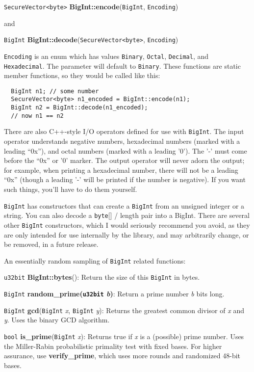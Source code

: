 \documentclass{article}
\newcommand{\function}[1]{\textbf{#1}}
\newcommand{\type}[1]{\texttt{#1}}
\renewcommand{\arg}[1]{\textsl{#1}}
\begin{document}
\type{SecureVector<byte>} \function{BigInt::encode}(\type{BigInt},
\type{Encoding})

\noindent
and

\type{BigInt} \function{BigInt::decode}(\type{SecureVector<byte>},
\type{Encoding})

\type{Encoding} is an enum which has values \type{Binary}, \type{Octal},
\type{Decimal}, and \type{Hexadecimal}. The parameter will default to
\type{Binary}. These functions are static member functions, so they would be
called like this:

\begin{verbatim}
  BigInt n1; // some number
  SecureVector<byte> n1_encoded = BigInt::encode(n1);
  BigInt n2 = BigInt::decode(n1_encoded);
  // now n1 == n2
\end{verbatim}

There are also C++-style I/O operators defined for use with \type{BigInt}. The
input operator understands negative numbers, hexadecimal numbers (marked with a
leading ``0x''), and octal numbers (marked with a leading '0'). The '-' must
come before the ``0x'' or '0' marker. The output operator will never adorn the
output; for example, when printing a hexadecimal number, there will not be a
leading ``0x'' (though a leading '-' will be printed if the number is
negative). If you want such things, you'll have to do them yourself.

\type{BigInt} has constructors that can create a \type{BigInt} from an unsigned
integer or a string. You can also decode a \type{byte}[] / length pair into a
BigInt. There are several other \type{BigInt} constructors, which I would
seriously recommend you avoid, as they are only intended for use internally by
the library, and may arbitrarily change, or be removed, in a future release.

An essentially random sampling of \type{BigInt} related functions:

\type{u32bit} \function{BigInt::bytes}(): Return the size of this \type{BigInt}
in bytes.

\type{BigInt} \function{random\_prime(\type{u32bit} \arg{b})}: Return a prime
number \arg{b} bits long.

\type{BigInt} \function{gcd}(\type{BigInt} \arg{x}, \type{BigInt} \arg{y}):
Returns the greatest common divisor of \arg{x} and \arg{y}. Uses the binary
GCD algorithm.

\type{bool} \function{is\_prime}(\type{BigInt} \arg{x}): Returns true if
\arg{x} is a (possible) prime number. Uses the Miller-Rabin probabilistic
primality test with fixed bases. For higher assurance, use
\function{verify\_prime}, which uses more rounds and randomized 48-bit bases.
\end{document}
